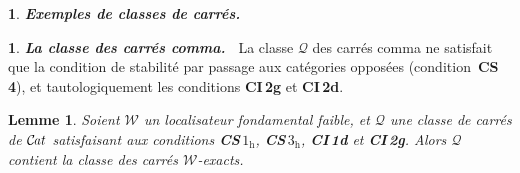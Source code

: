 \documentclass[francais]{smfart}
\theoremstyle{plain}
\newtheorem{lemme}[thm]{Lemme}
\theoremstyle{remark}
\theoremstyle{definition}
\newtheorem{paragr}[thm]{}
\newtheorem{subparagr}{}[thm]
\numberwithin{equation}{thm}
\begin{document}
\begin{paragr} {\emph{\textbf{{Exemples de classes de carrés}.\ }}}
\begin{subparagr} {\emph{\textbf{{La classe des carrés comma}.\ }}} \label{classcommacar} La classe ${\mathcal{Q}}$ des carrés comma ne satisfait que la condition de stabilité par passage aux catégories opposées (condition~\textbf{CS\,4}), et tautologiquement les conditions \textbf{CI\,2g} et \textbf{CI\,2d}.
\end{subparagr}
\end{paragr}

\begin{lemme} \label{condsuffex1}
Soient ${\mathcal{W}}$ un localisateur fondamental faible, et ${\mathcal{Q}}$ une classe de carrés de ${{\mathcal{C} \mspace{-2.mu} \it{at}}}$ satisfaisant aux conditions \emph{\textbf{\boldmath CS\,$1_{\mathrm h}$}, \textbf{\boldmath CS\,$3_{\mathrm h}$}, \textbf{CI\,1d}} et \emph{\textbf{CI\,2g}}. Alors ${\mathcal{Q}}$ contient la classe des carrés ${\mathcal{W}}${\nobreakdash}-exacts.
\end{lemme}
\end{document}
